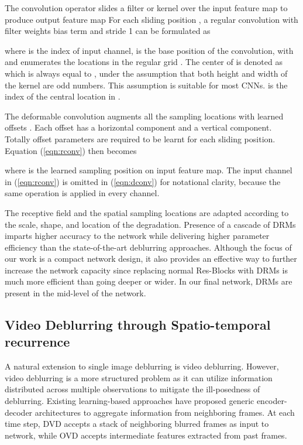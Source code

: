 \documentclass[10pt,twocolumn,letterpaper]{article}
\begin{document}
The convolution operator slides a filter or kernel over the input feature map  to produce output feature map  For each sliding position , a regular convolution with filter weights  bias term  and stride 1 can be formulated as


where  is the index of input channel,  is the base position of the convolution,  with  and  enumerates the locations in the regular grid . The center of  is denoted as  which is always equal to , under the assumption that both height and width of the kernel are odd numbers. This assumption is suitable for most CNNs.  is the index of the central location in .

The deformable convolution augments all the sampling locations with learned offsets . Each offset has a horizontal component and a vertical component. Totally  offset parameters are required to be learnt for each sliding position. Equation (\ref{eqn:rconv}) then becomes

where  is the learned sampling position on input feature map. The input channel  in (\ref{eqn:rconv}) is omitted in (\ref{eqn:dconv}) for notational clarity, because the same operation is applied in every channel.


The receptive field and the spatial sampling locations are adapted according to the scale, shape, and location of the degradation. Presence of a cascade of DRMs imparts higher accuracy to the network while delivering higher parameter efficiency than the state-of-the-art deblurring approaches. Although the focus of our work is a compact network design, it also provides an effective way to further increase the network capacity since replacing normal Res-Blocks with DRMs is much more efficient than going deeper or wider. In our final network,  DRMs are present in the mid-level of the network.

 
 \subsection{Video Deblurring through Spatio-temporal recurrence}

A natural extension to single image deblurring is video deblurring. However, video deblurring is a more structured problem as it can utilize information distributed across multiple observations to mitigate the ill-posedness of deblurring. Existing learning-based approaches \cite{su2017deep,hyun2017online} have proposed generic encoder-decoder architectures to aggregate information from neighboring frames. At each time step, DVD \cite{su2017deep} accepts a stack of neighboring blurred frames as input to network, while OVD \cite{hyun2017online} accepts intermediate features extracted from past frames.
 
\end{document}
